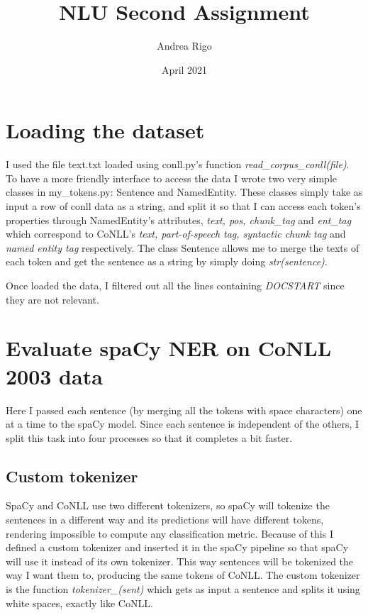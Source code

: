 \documentclass[twocolumn, a4paper]{article}
\title{\textbf{NLU Second Assignment}}
\author{Andrea Rigo}
\date{April 2021}
\begin{document}
\maketitle

\section{Loading the dataset}
I used the file text.txt loaded using conll.py's function \textit{read\_corpus\_conll(file)}. To have a more friendly interface to access the data I wrote two very simple classes in my\_tokens.py: Sentence and NamedEntity. These classes simply take as input a row of conll data as a string, and split it so that I can access each token's properties through NamedEntity's attributes, \textit{text, pos, chunk\_tag} and \textit{ent\_tag} which correspond to CoNLL's \textit{text, part-of-speech tag, syntactic chunk tag} and \textit{named entity tag} respectively. The class Sentence allows me to merge the texts of each token and get the sentence as a string by simply doing \textit{str(sentence)}.

Once loaded the data, I filtered out all the lines containing \textit{DOCSTART} since they are not relevant.

\section{Evaluate spaCy NER on CoNLL 2003 data}
Here I passed each sentence (by merging all the tokens with space characters) one at a time to the spaCy model. Since each sentence is independent of the others, I split this task into four processes so that it completes a bit faster.

\subsection{Custom tokenizer}
SpaCy and CoNLL use two different tokenizers, so spaCy will tokenize the sentences in a different way and its predictions will have different tokens, rendering impossible to compute any classification metric. Because of this I defined a custom tokenizer and inserted it in the spaCy pipeline so that spaCy will use it instead of its own tokenizer. This way sentences will be tokenized the way I want them to, producing the same tokens of CoNLL. The custom tokenizer is the function \textit{tokenizer\_(sent)} which gets as input a sentence and splits it using white spaces, exactly like CoNLL.
\end{document}
